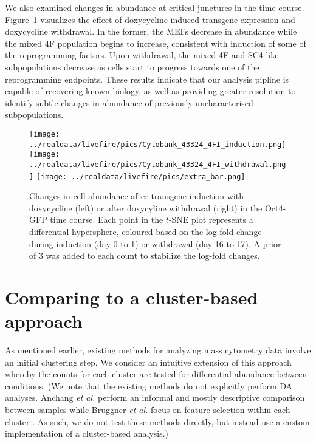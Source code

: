 \documentclass{article}
\begin{document}
We also examined changes in abundance at critical junctures in the time course.
Figure~\ref{fig:importanttime} visualizes the effect of doxycycline-induced transgene expression and doxycycline withdrawal.
In the former, the MEFs decrease in abundance while the mixed 4F population begins to increase, consistent with induction of some of the reprogramming factors.
Upon withdrawal, the mixed 4F and SC4-like subpopulations decrease as cells start to progress towards one of the reprogramming endpoints.
These results indicate that our analysis pipline is capable of recovering known biology, as well as providing greater resolution to identify subtle changes in abundance of previously uncharacterised subpopulations.

\begin{figure}[bt]
    \begin{center}
        \texttt{[image: ../realdata/livefire/pics/Cytobank\_43324\_4FI\_induction.png]}
        \texttt{[image: ../realdata/livefire/pics/Cytobank\_43324\_4FI\_withdrawal.png]}
        \texttt{[image: ../realdata/livefire/pics/extra\_bar.png]}
    \end{center}
    \caption{
        Changes in cell abundance after transgene induction with doxycycline (left) or after doxycyline withdrawal (right) in the Oct4-GFP time course.
        Each point in the $t$-SNE plot represents a differential hypersphere, coloured based on the log-fold change during induction (day 0 to 1) or withdrawal (day 16 to 17).
        A prior of 3 was added to each count to stabilize the log-fold changes.
    }
    \label{fig:importanttime}
\end{figure}

\section{Comparing to a cluster-based approach}
As mentioned earlier, existing methods for analyzing mass cytometry data involve an initial clustering step.
We consider an intuitive extension of this approach whereby the counts for each cluster are tested for differential abundance between conditions.
(We note that the existing methods do not explicitly perform DA analyses.
Anchang \textit{et al.} perform an informal and mostly descriptive comparison between samples \cite{anchang2016visualization} while Bruggner \textit{et al.} focus on feature selection within each cluster \cite{bruggner2014automated}.
As such, we do not test these methods directly, but instead use a custom implementation of a cluster-based analysis.)
\end{document}
